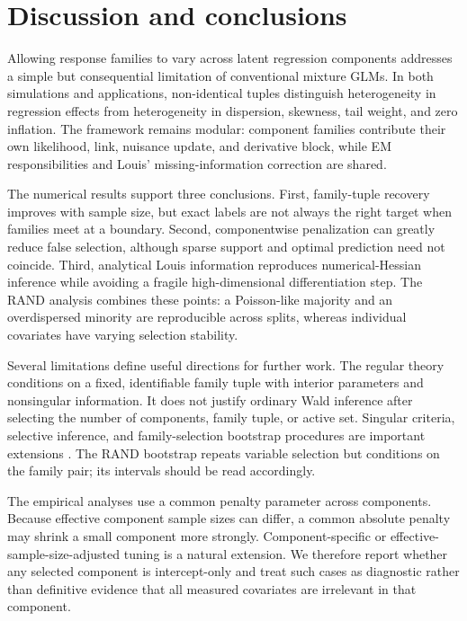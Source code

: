 \documentclass[11pt]{article}
\begin{document}
\section{Discussion and conclusions}
\label{sec:discussion}

Allowing response families to vary across latent regression components
addresses a simple but consequential limitation of conventional mixture GLMs.
In both simulations and applications, non-identical tuples distinguish
heterogeneity in regression effects from heterogeneity in dispersion, skewness,
tail weight, and zero inflation.  The framework remains modular: component
families contribute their own likelihood, link, nuisance update, and derivative
block, while EM responsibilities and Louis' missing-information correction are
shared.

The numerical results support three conclusions.  First, family-tuple recovery
improves with sample size, but exact labels are not always the right target when
families meet at a boundary.  Second, componentwise penalization can greatly
reduce false selection, although sparse support and optimal prediction need not
coincide.  Third, analytical Louis information reproduces numerical-Hessian
inference while avoiding a fragile high-dimensional differentiation step.  The
RAND analysis combines these points: a Poisson-like majority and an
overdispersed minority are reproducible across splits, whereas individual
covariates have varying selection stability.

Several limitations define useful directions for further work.  The regular
theory conditions on a fixed, identifiable family tuple with interior
parameters and nonsingular information.  It does not justify ordinary Wald
inference after selecting the number of components, family tuple, or active
set.  Singular criteria, selective inference, and family-selection bootstrap
procedures are important extensions \citep{drton2017sbic,leeb2005selection}.
The RAND bootstrap repeats variable selection but conditions on the family pair;
its intervals should be read accordingly.

The empirical analyses use a common penalty parameter across components.
Because effective component sample sizes can differ, a common absolute penalty
may shrink a small component more strongly.  Component-specific or
effective-sample-size-adjusted tuning is a natural extension.  We therefore
report whether any selected component is intercept-only and treat such cases as
diagnostic rather than definitive evidence that all measured covariates are
irrelevant in that component.
\end{document}
